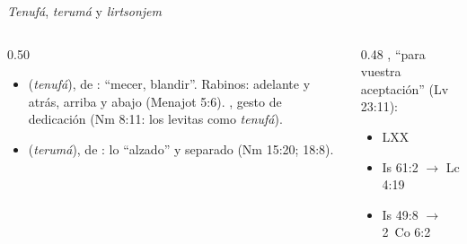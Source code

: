 \begin{frame}{\emph{Tenufá}, \emph{terumá} y \emph{lirtsonjem}}
\begin{columns}[t,onlytextwidth]
\begin{column}{0.50\textwidth}\small\RaggedRight
\begin{itemize}
\item {} (\emph{tenufá}), de : ``mecer, blandir''. Rabinos: adelante y atrás, arriba y abajo (Menajot 5:6). , gesto de dedicación (Nm 8:11: los levitas como \emph{tenufá}).
\item {} (\emph{terumá}), de : lo ``alzado'' y separado (Nm 15:20; 18:8).
\end{itemize}
\end{column}
\begin{column}{0.48\textwidth}\small\RaggedRight
{}, ``para vuestra aceptación'' (Lv 23:11):
\begin{itemize}
\item LXX 
\item Is 61:2  $\rightarrow$ Lc 4:19 
\item Is 49:8 $\rightarrow$ 2~Co 6:2 
\end{itemize}
\end{column}
\end{columns}
\end{frame}

